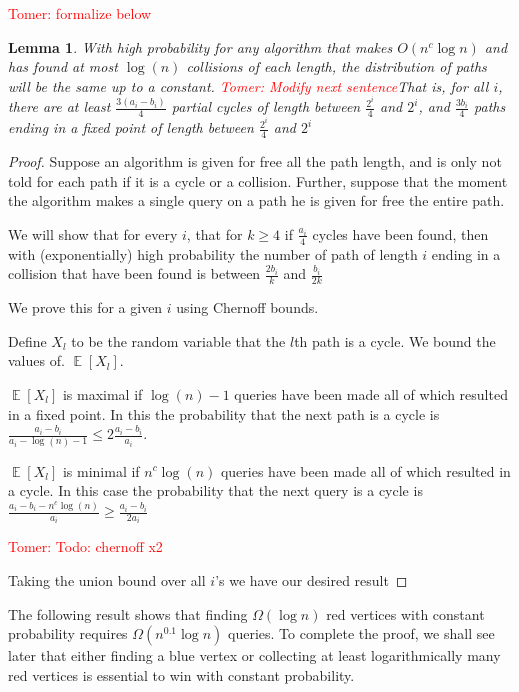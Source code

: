 \documentclass[11pt]{article}
\numberwithin{equation}{section}
\newtheorem{lemma}[lemma]{Lemma}
\newcommand\E{\mathop{\mathbb E}}
\newcommand{\1}{\mathbf{1}}
\newcommand\tomer[1]{{\textcolor{red}{Tomer: #1}}}
\begin{document}
\tomer{formalize below}
\begin{lemma} \label{Lem:distDoesntChange}
With high probability for any algorithm that makes $O(n^c \log n)$ and has found at most $\log(n)$ collisions of each length, the distribution of paths will be the same up to a constant. \tomer{Modify next sentence}That is, for all $i$, there are at least $\frac{3(a_i - b_i)}{4}$ partial cycles of length between $\frac{2^i}{4}$ and $2^i$, and $\frac{3b_i}{4}$ paths ending in a fixed point of length between $\frac{2^i}{4}$ and $2^i$
\end{lemma}

\begin{proof}
Suppose an algorithm is given for free all the path length, and is only not told for each path if it is a cycle or a collision. Further, suppose that the moment the algorithm makes a single query on a path he is given for free the entire path.

We will show that for every $i$, that for  $k \ge 4$ if $\frac{a_i}{4}$ cycles have been found, then with (exponentially) high probability the number of path of length $i$ 
ending in a collision that have been found is between $\frac{2b_i}{k}$ and $\frac{b_i}{2k}$

We prove this for a given $i$ using Chernoff bounds. 

Define $X_l$ to be the random variable that the $l$th path is a cycle. We bound the values of. $\E[X_l]$.

$\E[X_l]$ is maximal if $\log(n)-1$ queries have been made all of which resulted in a fixed point. In this the probability that the next path is a cycle is $\frac{a_i - b_i}{a_i - \log(n) - 1} \le 2\frac{a_i-b_i}{a_i}$.

$\E[X_l]$ is minimal if $n^c \log(n)$ queries have been made all of which resulted in a cycle. In this case the probability that the next query is a cycle is $\frac{a_i - b_i - n^c \log(n)}{a_i} \ge \frac{a_i-b_i}{2a_i} $

\tomer{Todo: chernoff x2}



Taking the union bound over all $i$'s we have our desired result












\end{proof}
\fi

The following result shows that finding $\Omega(\log n)$ red vertices with constant probability requires $\Omega(n^{0.1} \log n)$ queries. To complete the proof, we shall see later that either finding a blue vertex or collecting at least logarithmically many red vertices is essential to win with constant probability.
\end{document}
